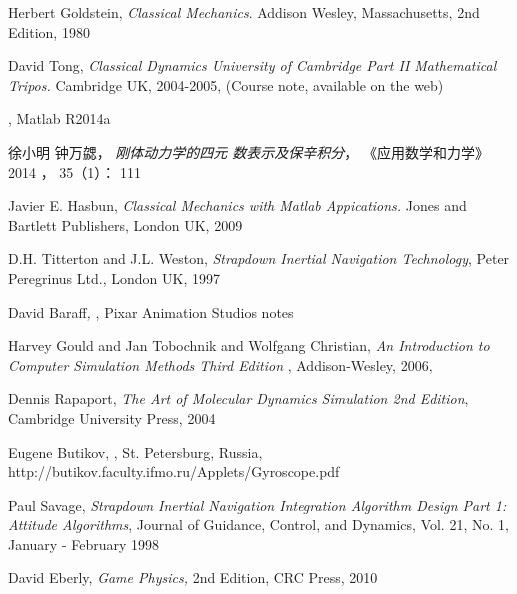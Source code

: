 \documentclass[12pt,twoside]{article}
\begin{document}
\begin{thebibliography}{99}
 Herbert Goldstein, \emph{Classical Mechanics}. Addison
Wesley, Massachusetts, 2nd Edition, 1980

 David Tong, \emph{Classical Dynamics University of Cambridge
Part II Mathematical Tripos.} Cambridge UK, 2004-2005, (Course note,
available on the web)

 \href{http://www.mathworks.com/help/matlab/ordinary-differential-equations.html%
}{\underline{\color{blue}%
}}, Matlab R2014a

 徐小明 钟万勰，%
\textit{刚体动力学的四元%
数表示及保辛积分}，%
《应用数学和力学》 2014%
， 35（1）： 111

 Javier E. Hasbun, \emph{Classical Mechanics with Matlab
Appications.} Jones and Bartlett Publishers, London UK, 2009

 D.H. Titterton and J.L. Weston, \emph{Strapdown Inertial
Navigation Technology}, Peter Peregrinus Ltd., London UK, 1997

 David Baraff\textit{, }\href{http://graphics.cs.cmu.edu/courses/15-869-F08/lec/14/notesg.pdf%
}{\underline{\color{blue}%
}}, Pixar Animation Studios notes

 Harvey Gould and Jan Tobochnik and Wolfgang
Christian, \emph{An Introduction to Computer Simulation Methods Third Edition%
}, Addison-Wesley, 2006, \href{http://www.opensourcephysics.org/items/detail.cfm?ID=7375%
}{\underline{\color{blue}}}

 Dennis Rapaport, \emph{The Art of Molecular Dynamics
Simulation 2nd Edition}, Cambridge University Press, 2004

 Eugene Butikov, \href{http://butikov.faculty.ifmo.ru/Applets/Gyroscope.pdf%
}{\underline{\color{blue}}},
St. Petersburg, Russia, http://butikov.faculty.ifmo.ru/Applets/Gyroscope.pdf

 Paul Savage, \emph{Strapdown Inertial Navigation
Integration Algorithm Design Part 1: Attitude Algorithms}, Journal of
Guidance, Control, and Dynamics, Vol. 21, No. 1, January - February 1998

 David Eberly, \emph{Game Physics,} 2nd Edition, CRC Press,
2010
\end{thebibliography}
\end{document}
